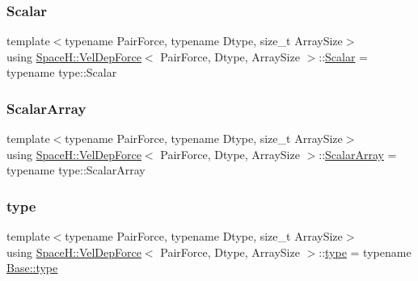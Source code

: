 \subsubsection{\texorpdfstring{Scalar}{Scalar}}
{\footnotesize\ttfamily template$<$typename Pair\+Force, typename Dtype, size\+\_\+t Array\+Size$>$ \\
using \mbox{\hyperlink{struct_space_h_1_1_vel_dep_force}{Space\+H\+::\+Vel\+Dep\+Force}}$<$ Pair\+Force, Dtype, Array\+Size $>$\+::\mbox{\hyperlink{struct_space_h_1_1_vel_dep_force_abbc363fffee12f9e015fd4978c132aad}{Scalar}} =  typename type\+::\+Scalar}

\mbox{\label{struct_space_h_1_1_vel_dep_force_ae4efbb88779fc063293b7853184378ac}} 
\subsubsection{\texorpdfstring{Scalar\+Array}{ScalarArray}}
{\footnotesize\ttfamily template$<$typename Pair\+Force, typename Dtype, size\+\_\+t Array\+Size$>$ \\
using \mbox{\hyperlink{struct_space_h_1_1_vel_dep_force}{Space\+H\+::\+Vel\+Dep\+Force}}$<$ Pair\+Force, Dtype, Array\+Size $>$\+::\mbox{\hyperlink{struct_space_h_1_1_vel_dep_force_ae4efbb88779fc063293b7853184378ac}{Scalar\+Array}} =  typename type\+::\+Scalar\+Array}

\mbox{\label{struct_space_h_1_1_vel_dep_force_a734e14a30f08b7c4bf6c8cd529c0bd1c}} 
\subsubsection{\texorpdfstring{type}{type}}
{\footnotesize\ttfamily template$<$typename Pair\+Force, typename Dtype, size\+\_\+t Array\+Size$>$ \\
using \mbox{\hyperlink{struct_space_h_1_1_vel_dep_force}{Space\+H\+::\+Vel\+Dep\+Force}}$<$ Pair\+Force, Dtype, Array\+Size $>$\+::\mbox{\hyperlink{struct_space_h_1_1_vel_dep_force_a734e14a30f08b7c4bf6c8cd529c0bd1c}{type}} =  typename \mbox{\hyperlink{struct_space_h_1_1_force_a151c6ae1ec7ad87825c2b6cc74aee5f2}{Base\+::type}}}

